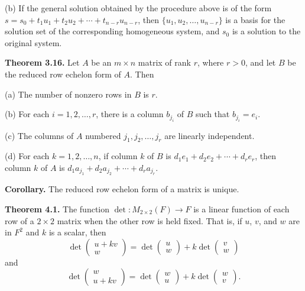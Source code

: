 \documentclass{article}
\newcommand{\0}{\mathit{0}}
\begin{document}
(b) If the general solution obtained by the procedure above is of the form
$s = s_0 + t_1u_1 + t_2u_2 + \cdots + t_{n-r}u_{n-r}$,
then $\{u_1, u_2, \ldots, u_{n-r}\}$ is a basis for the solution set of the
corresponding homogeneous system, and $s_0$ is a solution to the original
system.

\medskip

\textbf{Theorem 3.16.} Let $A$ be an $m \times n$ matrix of rank $r$, where $r > 0$,
and let $B$ be the reduced row echelon form of $A$. Then

(a) The number of nonzero rows in $B$ is $r$.

(b) For each $i = 1, 2, \ldots, r$, there is a column $b_{j_i}$ of $B$ such that
$b_{j_i} = e_i$.

(c) The columns of $A$ numbered $j_1, j_2, \ldots, j_r$ are linearly independent.

(d) For each $k = 1, 2, \ldots, n$, if column $k$ of $B$ is
$d_1 e_1 + d_2 e_2 + \cdots + d_r e_r$, then column $k$ of $A$ is
$d_1 a_{j_1} + d_2 a_{j_2} + \cdots + d_r a_{j_r}$.

\medskip

\textbf{Corollary.} The reduced row echelon form of a matrix is unique.

\textbf{Theorem 4.1.} The function $\det: M_{2 \times 2}(F) \to F$ is a linear
function of each row of a $2 \times 2$ matrix when the other row is held fixed.
That is, if $u$, $v$, and $w$ are in $F^2$ and $k$ is a scalar, then
\[
    \det\begin{pmatrix} u + kv \\ w \end{pmatrix} =
    \det\begin{pmatrix} u \\ w \end{pmatrix} +
    k \det\begin{pmatrix} v \\ w \end{pmatrix}
\]
and
\[
    \det\begin{pmatrix} w \\ u + kv \end{pmatrix} =
    \det\begin{pmatrix} w \\ u \end{pmatrix} +
    k \det\begin{pmatrix} w \\ v \end{pmatrix}.
\]

\medskip
\end{document}
